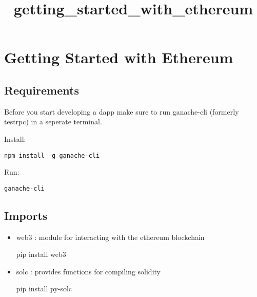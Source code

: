 \documentclass[11pt]{article}
\title{getting\_started\_with\_ethereum}
\newenvironment{Shaded}{}{}
\newcommand{\NormalTok}[1]{{#1}}
\newcommand{\ExtensionTok}[1]{{#1}}
\begin{document}
    
    
    \maketitle
    
    

    
    \section{\texorpdfstring{\textbf{Getting Started with
Ethereum}}{Getting Started with Ethereum}}\label{getting-started-with-ethereum}

\subsection{Requirements}\label{requirements}

Before you start developing a dapp make sure to run ganache-cli
(formerly testrpc) in a seperate terminal.

Install:

\begin{verbatim}
npm install -g ganache-cli
\end{verbatim}

Run:

\begin{verbatim}
ganache-cli
\end{verbatim}

    \subsection{Imports}\label{imports}

\begin{itemize}
\item
  web3 : module for interacting with the ethereum blockchain

\begin{Shaded}
\begin{Highlighting}[]
\ExtensionTok{pip}\NormalTok{ install web3}
\end{Highlighting}
\end{Shaded}
\item
  solc : provides functions for compiling solidity

\begin{Shaded}
\begin{Highlighting}[]
\ExtensionTok{pip}\NormalTok{ install py-solc}
\end{Highlighting}
\end{Shaded}
\end{itemize}
\end{document}
